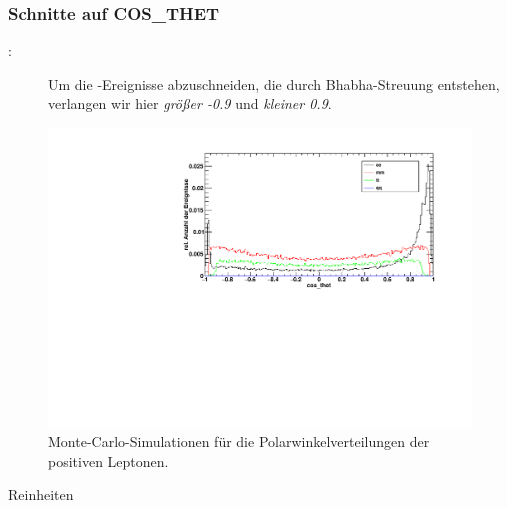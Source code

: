 \subsubsection*{Schnitte auf COS\_THET}
\begin{description}
\item[\Zee:] Um die \ee-Ereignisse abzuschneiden, die durch Bhabha-Streuung entstehen,
verlangen wir hier \emph{größer -0.9} und \emph{kleiner 0.9}.
\end{description}

\begin{figure}[H]
\begin{center}
  \includegraphics[width=\textwidth]{../img/dist_cos_thet.pdf}
 \caption{Monte-Carlo-Simulationen für die Polarwinkelverteilungen der positiven Leptonen.}
  \label{img:dist_cos_thet}
\end{center}
\end{figure} 

Reinheiten
